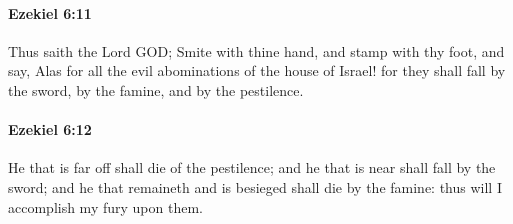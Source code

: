 		\paragraph{Ezekiel 6:11} %
			\label{EZEKIEL-6-11}

			Thus saith the Lord GOD; Smite with thine hand, and stamp with thy foot, and say, Alas for all the evil abominations of the house of Israel! for they shall fall by the sword, by the famine, and by the pestilence.


		\paragraph{Ezekiel 6:12} %
			\label{EZEKIEL-6-12}

			He that is far off shall die of the pestilence; and he that is near shall fall by the sword; and he that remaineth and is besieged shall die by the famine: thus will I accomplish my fury upon them.

